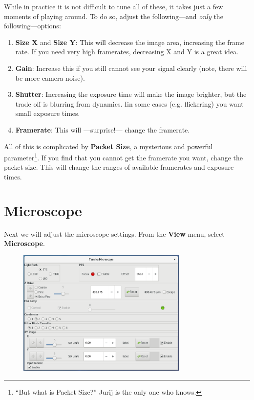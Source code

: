 \documentclass{report}
\begin{document}
While in practice it is not difficult to tune all of these, it takes just a few moments of playing around. To do so, adjust the following---and \emph{only} the following---options:
\begin{enumerate}
	\item \textbf{Size X} and \textbf{Size Y}: This will decrease the image area, increasing the frame rate. If you need very high framerates, decreasing X and Y is a great idea.
	\item \textbf{Gain}: Increase this if you still cannot see your signal clearly (note, there will be more camera noise).
	\item \textbf{Shutter}: Increasing the exposure time will make the image brighter, but the trade off is blurring from dynamics. Iin some cases (e.g. flickering) you want small exposure times.
	\item \textbf{Framerate}: This will ---surprise!--- change the framerate.
\end{enumerate}

All of this is complicated by \textbf{Packet Size}, a mysterious and powerful parameter\footnote{``But what is Packet Size?'' Jurij is the only one who knows.}. If you find that you cannot get the framerate you want, change the packet size. This will change the ranges of available framerates and exposure times.





\newpage

\section{Microscope}

Next we will adjust the microscope settings. From the \textbf{View} menu, select \textbf{Microscope}.\\

\begin{figure}[h!]
\centering
\includegraphics[width=0.75\textwidth]{microscope}
\end{figure}
\end{document}
